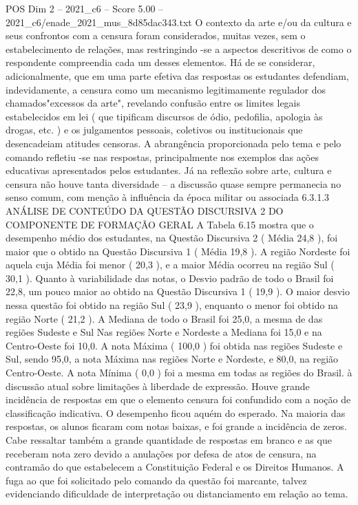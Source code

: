 \begin{textsample}{POS Dim 2 – 2021\_c6 – Score 5.00 – 2021\_c6/enade\_2021\_mus\_8d85dac343.txt}
O contexto da arte e/ou da cultura e seus confrontos com a censura foram considerados, muitas vezes, sem o estabelecimento de relações, mas restringindo -se a aspectos descritivos de como o respondente compreendia cada um desses elementos.
Há de se considerar, adicionalmente, que em uma parte efetiva das respostas os estudantes defendiam, indevidamente, a censura como um mecanismo legitimamente regulador dos chamados"excessos da arte", revelando confusão entre os limites legais estabelecidos em lei ( que tipificam discursos de ódio, pedofilia, apologia às drogas, etc. ) e os julgamentos pessoais, coletivos ou institucionais que desencadeiam atitudes censoras.
A abrangência proporcionada pelo tema e pelo comando refletiu -se nas respostas, principalmente nos exemplos das ações educativas apresentados pelos estudantes.
Já na reflexão sobre arte, cultura e censura não houve tanta diversidade – a discussão quase sempre permanecia no senso comum, com menção à influência da época militar ou associada 6.3.1.3 ANÁLISE DE CONTEÚDO DA QUESTÃO DISCURSIVA 2 DO COMPONENTE DE FORMAÇÃO GERAL A Tabela 6.15 mostra que o desempenho médio dos estudantes, na Questão Discursiva 2 ( Média 24,8 ), foi maior que o obtido na Questão Discursiva 1 ( Média 19,8 ).
A região Nordeste foi aquela cuja Média foi menor ( 20,3 ), e a maior Média ocorreu na região Sul ( 30,1 ).
Quanto à variabilidade das notas, o Desvio padrão de todo o Brasil foi 22,8, um pouco maior ao obtido na Questão Discursiva 1 ( 19,9 ).
O maior desvio nessa questão foi obtido na região Sul ( 23,9 ), enquanto o menor foi obtido na região Norte ( 21,2 ).
A Mediana de todo o Brasil foi 25,0, a mesma de das regiões Sudeste e Sul Nas regiões Norte e Nordeste a Mediana foi 15,0 e na Centro-Oeste foi 10,0.
A nota Máxima ( 100,0 ) foi obtida nas regiões Sudeste e Sul, sendo 95,0, a nota Máxima nas regiões Norte e Nordeste, e 80,0, na região Centro-Oeste.
A nota Mínima ( 0,0 ) foi a mesma em todas as regiões do Brasil. à discussão atual sobre limitações à liberdade de expressão.
Houve grande incidência de respostas em que o elemento censura foi confundido com a noção de classificação indicativa.
O desempenho ficou aquém do esperado.
Na maioria das respostas, os alunos ficaram com notas baixas, e foi grande a incidência de zeros.
Cabe ressaltar também a grande quantidade de respostas em branco e as que receberam nota zero devido a anulações por defesa de atos de censura, na contramão do que estabelecem a Constituição Federal e os Direitos Humanos.
A fuga ao que foi solicitado pelo comando da questão foi marcante, talvez evidenciando dificuldade de interpretação ou distanciamento em relação ao tema.

\end{textsample}
